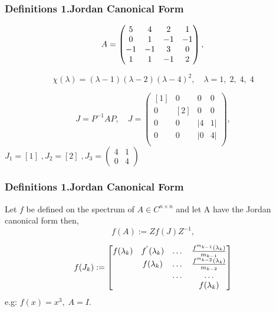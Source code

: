 
\begin{frame}

\frametitle{Definitions \newline 1.Jordan Canonical Form}

\[
A = \begin{pmatrix}
    5 & 4 & 2 & 1 \\
    0 & 1 &-1 & -1 \\
    -1 & -1 &3 &0  \\
    1 &1 &-1 &2
    \end{pmatrix},\newline 
\]

\[
\chi(\lambda) = (\lambda -1)(\lambda -2)(\lambda -4)^{2},
\quad \lambda = 1,\; 2,\;4 ,\;4
\]

\[
J = P^{-1}AP, \quad J = \begin{pmatrix}
    [1] &0&0 &0 \\
     0& [2]&0&0 \\
     0&0 & |4& 1| \\0&0&|0&4| \\
    \end{pmatrix} , 
    \]
    $
        J_{1} = [1] \;, J_{2} = [2] \;,J_{3} = \begin{pmatrix}
            4&1 \\
            0&4
    \end{pmatrix}  
    $
    
\end{frame}


\begin{frame}

    \frametitle{Definitions \newline 1.Jordan Canonical Form}
    Let $f$ be defined on
    the spectrum of $A \in C^{n \times n}$ and let A have the Jordan canonical form then,
    \[
    f(A) := Zf(J)Z^{-1},
    \]

    \[
    f(J_{k}) := \begin{bmatrix}
        f(\lambda_{k}) & f^{'} (\lambda_{k}) & \dots & \frac{f^{m_{k-1}} (\lambda_k)} {m_{k-1}} \\ \newline
          & f(\lambda_k)& \dots & \frac{f^{m_{k-2}} (\lambda_k)} {m_{k-2}}  \\
          \newline
           & & \dots & \dots \\
           \newline
           &&& f(\lambda_k)
          
    \end{bmatrix}
    \]
    e.g: $f(x) = x^3, \; A =I.$ \newline

\end{frame}



